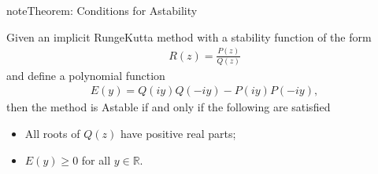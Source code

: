\documentclass[letterpaper,10pt,english]{jupyterBook}
\begin{document}
\begin{sphinxadmonition}{note}{Theorem: Conditions for A\sphinxhyphen{}stability}

\sphinxAtStartPar
Given an implicit Runge\sphinxhyphen{}Kutta method with a stability function of the form
\begin{align*}
    R(z) = \frac{P(z)}{Q(z)}
\end{align*}
\sphinxAtStartPar
and define a polynomial function
\begin{equation}\label{equation:4_Stability/4.3_IRK_stability_function:ey-definition}
\begin{split}E(y)=Q(iy)Q(-iy)-P(iy)P(-iy),\end{split}
\end{equation}
\sphinxAtStartPar
then the method is A\sphinxhyphen{}stable if and only if the following are satisfied
\begin{itemize}
\item {} 
\sphinxAtStartPar
All roots of \(Q(z)\) have positive real parts;

\item {} 
\sphinxAtStartPar
\(E(y)\geq 0\) for all \(y\in \mathbb{R}\).

\end{itemize}
\end{sphinxadmonition}
\end{document}
